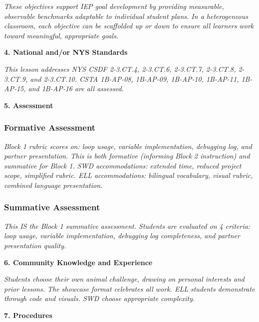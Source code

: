 \documentclass[11pt,letterpaper]{article}
\begin{document}
\textit{These objectives support IEP goal development by providing measurable, observable benchmarks adaptable to individual student plans. In a heterogeneous classroom, each objective can be scaffolded up or down to ensure all learners work toward meaningful, appropriate goals.}

\textbf{4. National and/or NYS Standards}

\textit{This lesson addresses NYS CSDF 2-3.CT.4, 2-3.CT.6, 2-3.CT.7, 2-3.CT.8, 2-3.CT.9, and 2-3.CT.10. CSTA 1B-AP-08, 1B-AP-09, 1B-AP-10, 1B-AP-11, 1B-AP-15, and 1B-AP-16 are all assessed.}

\newpage
\textbf{5. Assessment}

\subsubsection{Formative Assessment}

\textit{Block 1 rubric scores on: loop usage, variable implementation, debugging log, and partner presentation. This is both formative (informing Block 2 instruction) and summative for Block 1. SWD accommodations: extended time, reduced project scope, simplified rubric. ELL accommodations: bilingual vocabulary, visual rubric, combined language presentation.}

\subsubsection{Summative Assessment}

\textit{This IS the Block 1 summative assessment. Students are evaluated on 4 criteria: loop usage, variable implementation, debugging log completeness, and partner presentation quality.}

\textbf{6. Community Knowledge and Experience}

\textit{Students choose their own animal challenge, drawing on personal interests and prior lessons. The showcase format celebrates all work. ELL students demonstrate through code and visuals. SWD choose appropriate complexity.}

\textbf{7. Procedures}
\end{document}
